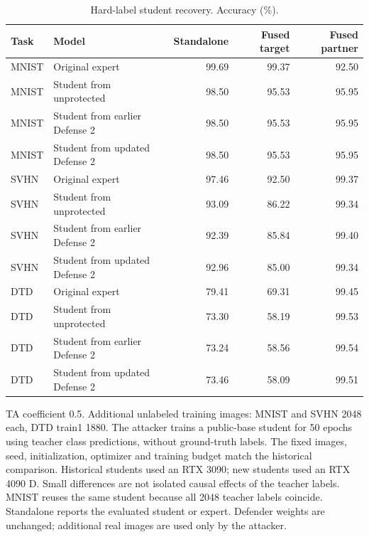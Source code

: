 \begin{table}[t]
\centering\small
\setlength{\tabcolsep}{4pt}
\caption{Hard-label student recovery. Accuracy (\%).}
\label{tab:defense2_hard_label}
\begin{tabular}{@{}llrrr@{}}
\toprule
Task & Model & Standalone & Fused target & Fused partner \\
\midrule
MNIST & Original expert & 99.69 & 99.37 & 92.50 \\
MNIST & Student from unprotected & 98.50 & 95.53 & 95.95 \\
MNIST & Student from earlier Defense 2 & 98.50 & 95.53 & 95.95 \\
MNIST & Student from updated Defense 2 & 98.50 & 95.53 & 95.95 \\
\midrule
SVHN & Original expert & 97.46 & 92.50 & 99.37 \\
SVHN & Student from unprotected & 93.09 & 86.22 & 99.34 \\
SVHN & Student from earlier Defense 2 & 92.39 & 85.84 & 99.40 \\
SVHN & Student from updated Defense 2 & 92.96 & 85.00 & 99.34 \\
\midrule
DTD & Original expert & 79.41 & 69.31 & 99.45 \\
DTD & Student from unprotected & 73.30 & 58.19 & 99.53 \\
DTD & Student from earlier Defense 2 & 73.24 & 58.56 & 99.54 \\
DTD & Student from updated Defense 2 & 73.46 & 58.09 & 99.51 \\
\bottomrule
\end{tabular}
\par\smallskip
\begin{minipage}{\textwidth}\footnotesize TA coefficient 0.5. Additional unlabeled training images: MNIST and SVHN 2048 each, DTD train1 1880. The attacker trains a public-base student for 50 epochs using teacher class predictions, without ground-truth labels. The fixed images, seed, initialization, optimizer and training budget match the historical comparison. Historical students used an RTX 3090; new students used an RTX 4090 D. Small differences are not isolated causal effects of the teacher labels. MNIST reuses the same student because all 2048 teacher labels coincide. Standalone reports the evaluated student or expert. Defender weights are unchanged; additional real images are used only by the attacker.\end{minipage}
\end{table}

